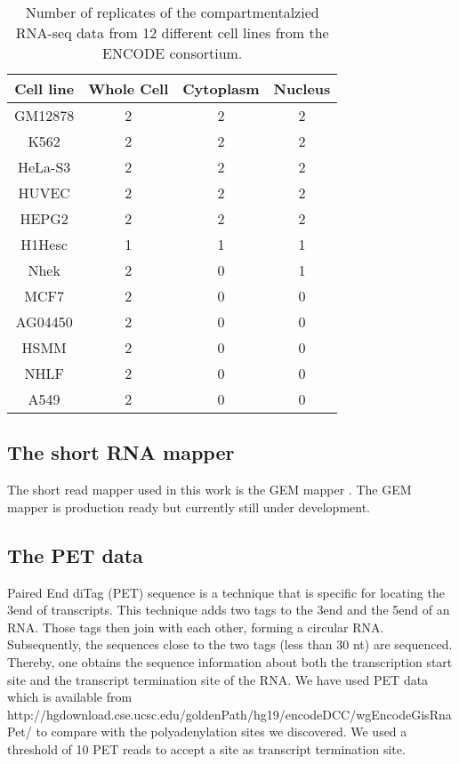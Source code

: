 \begin{table}[hb]
	\centering
	\begin{tabular}{cccc}
	  Cell line & Whole Cell & Cytoplasm & Nucleus \\
	  \midrule
	  GM12878 & 2 & 2 & 2 \\
	  K562 & 2 & 2 & 2 \\
	  HeLa-S3 & 2 & 2 & 2 \\
	  HUVEC & 2 & 2 & 2 \\
	  HEPG2 & 2 & 2 & 2 \\
	  H1Hesc & 1 & 1 & 1 \\
	  Nhek & 2 & 0 & 1 \\
	  MCF7 & 2 & 0 & 0 \\
	  AG04450 & 2 & 0 & 0 \\
	  HSMM & 2 & 0 & 0 \\
	  NHLF & 2 & 0 & 0 \\
	  A549 & 2 & 0 & 0 \\
	\end{tabular}
	\caption{Number of replicates of the compartmentalzied RNA-seq data from 12
	different cell lines from the ENCODE consortium.}
	\label{tab:Datasets}
\end{table}

\subsection{The short RNA mapper}
The short read mapper used in this work is the GEM mapper
\cite{ribeca_gem_2010}. The GEM mapper is production ready but currently still
under development.

\subsection{The PET data}
Paired End diTag (PET) sequence is a technique that is specific for locating
the 3\ppp end of transcripts. This technique adds two tags to the 3\ppp end and the
5\ppp end of an RNA. Those tags then join with each other, forming a circular
RNA. Subsequently, the sequences close to the two tags (less than 30 nt) are
sequenced. Thereby, one obtains the sequence information about both the
transcription start site and the transcript termination site of the RNA. We
have used PET data which is available from
http://hgdownload.cse.ucsc.edu/goldenPath/hg19/encodeDCC/wgEncodeGisRnaPet/ to
compare with the polyadenylation sites we discovered. We used a threshold of 10
PET reads to accept a site as transcript termination site.
